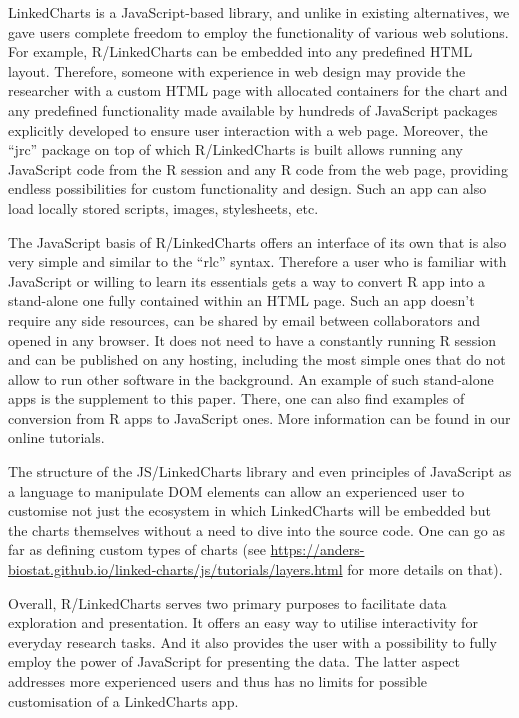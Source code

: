\documentclass[twocolumn,10pt]{article}
\begin{document}
LinkedCharts is a JavaScript-based library, and unlike in existing alternatives, we gave users complete freedom to employ the functionality of various web solutions. For example, R/LinkedCharts can be embedded into any predefined HTML layout. Therefore, someone with experience in web design may provide the researcher with a custom HTML page with allocated containers for the chart and any predefined functionality made available by hundreds of JavaScript packages explicitly developed to ensure user interaction with a web page. Moreover, the ``jrc'' package on top of which R/LinkedCharts is built allows running any JavaScript code from the R session and any R code from the web page, providing endless possibilities for custom functionality and design. Such an app can also load locally stored scripts, images, stylesheets, etc.

The JavaScript basis of R/LinkedCharts offers an interface of its own that is also very simple and similar to the ``rlc'' syntax. Therefore a user who is familiar with JavaScript or willing to learn its essentials gets a way to convert R app into a stand-alone one fully contained within an HTML page. Such an app doesn't require any side resources, can be shared by email between collaborators and opened in any browser. It does not need to have a constantly running R session and can be published on any hosting, including the most simple ones that do not allow to run other software in the background. An example of such stand-alone apps is the supplement to this paper. There, one can also find examples of conversion from R apps to JavaScript ones. More information can be found in our online tutorials.

The structure of the JS/LinkedCharts library and even principles of JavaScript as a language to manipulate DOM elements can allow an experienced user to customise not just the ecosystem in which LinkedCharts will be embedded but the charts themselves without a need to dive into the source code. One can go as far as defining custom types of charts (see \url{https://anders-biostat.github.io/linked-charts/js/tutorials/layers.html} for more details on that).

Overall, R/LinkedCharts serves two primary purposes to facilitate data exploration and presentation. It offers an easy way to utilise interactivity for everyday research tasks. And it also provides the user with a possibility to fully employ the power of JavaScript for presenting the data. The latter aspect addresses more experienced users and thus has no limits for possible customisation of a LinkedCharts app.
\end{document}
